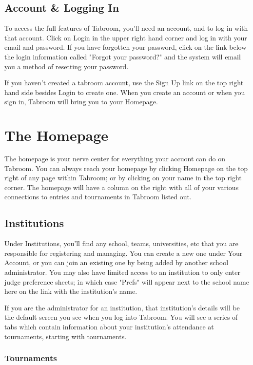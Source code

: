 \documentclass[12pt]{report}
\begin{document}
	\section{Account \& Logging In} 

	To access the full features of Tabroom, you'll need an account, and to log
	in with that account.  Click on Login in the upper right hand corner and
	log in with your email and password.  If you have forgotten your password,
	click on the link below the login information called "Forgot your password?"
	and the system will email you a method of resetting your password.  

	If you haven't created a tabroom account, use the Sign Up link on the top
	right hand side besides Login to create one.  When you create an account or
	when you sign in, Tabroom will bring you to your Homepage.

\chapter{The Homepage} 

	The homepage is your nerve center for everything your accuont can do on
	Tabroom.  You can always reach your homepage by clicking Homepage on the
	top right of any page within Tabroom; or by clicking on your name in the
	top right corner.  The homepage will have a column on the right with all of
	your various connections to entries and tournaments in Tabroom listed out.

	\section{Institutions}

	Under Institutions, you'll find any school, teams, universities, etc that
	you are responsible for registering and managing.  You can create a new one
	under Your Account, or you can join an existing one by being added by
	another school administrator.  You may also have limited access to an
	institution to only enter judge preference sheets; in which case "Prefs"
	will appear next to the school name here on the link with the institution's
	name.

	If you are the administrator for an institution, that institution's details
	will be the default screen you see when you log into Tabroom.  You will see
	a series of tabs which contain information about your institution's attendance
	at tournaments, starting with tournaments.

	\subsection{Tournaments}
\end{document}
